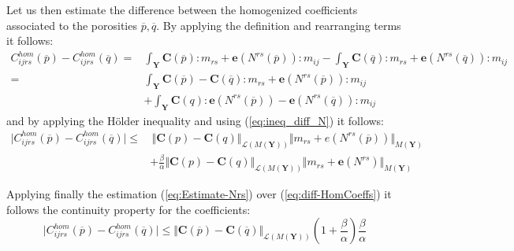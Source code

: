Let us then estimate the difference between the homogenized coefficients associated to the porosities $\overline{p},\overline{q}$. By applying the definition and rearranging terms it follows:
\begin{equation*}
    \begin{aligned}
        C^{hom}_{ijrs}(\overline{p}) - C^{hom}_{ijrs}(\overline{q}) = & \int_{\mathbf{Y}} \mathbf{C}(\overline{p}):m_{rs} + \mathbf{e}(N^{rs}(\overline{p})):m_{ij} - \int_{\mathbf{Y}} \mathbf{C}(\overline{q}):m_{rs} + \mathbf{e}(N^{rs}(\overline{q})):m_{ij}\\
        = & \int_{\mathbf{Y}} \mathbf{C}(\overline{p}) - \mathbf{C}(\overline{q}):m_{rs} + \mathbf{e}(N^{rs}(\overline{p})):m_{ij} \\
        & + \int_{\mathbf{Y}} \mathbf{C}(q):\mathbf{e}(N^{rs}(\overline{p})) - \mathbf{e}(N^{rs}(\overline{q})):m_{ij} 
    \end{aligned}
\end{equation*}
and by applying the H\"{o}lder inequality and using (\ref{eq:ineq_diff_N}) it follows:
\begin{equation}
    \label{eq:diff-HomCoeffs}
    \begin{aligned}
        \vert C^{hom}_{ijrs}(\overline{p}) - C^{hom}_{ijrs}(\overline{q})\vert \leq & \, \Vert \mathbf{C}(p)-\mathbf{C}(q) \Vert_{\mathcal{L}(M(\mathbf{Y}))} \Vert m_{rs}+e(N^{rs}(\overline{p})) \Vert_{M(\mathbf{Y})} \\
         & +  \frac{\beta}{\alpha} \Vert \mathbf{C}(p)-\mathbf{C}(q) \Vert_{\mathcal{L}(M(\mathbf{Y}))} \Vert m_{rs}+\mathbf{e}(N^{rs}) \Vert_{M(\mathbf{Y})} 
    \end{aligned}
\end{equation}

Applying finally the estimation (\ref{eq:Estimate-Nrs}) over (\ref{eq:diff-HomCoeffs}) it follows the continuity property for the coefficients:
\begin{equation}
    \label{ContinuityPropHom}
    \vert C^{hom}_{ijrs}(\overline{p}) - C^{hom}_{ijrs}(\overline{q})\vert \leq \Vert \mathbf{C}(\overline{p}) - \mathbf{C}(\overline{q}) \Vert_{\mathcal{L}(M(\mathbf{Y}))} (1+\frac{\beta}{\alpha})\frac{\beta}{\alpha}
\end{equation}


